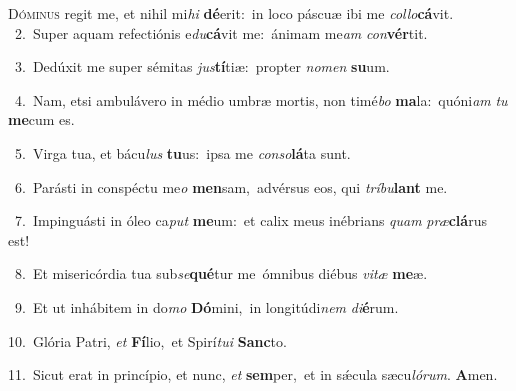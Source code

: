 \lettrine{\initial\textcolor{\initialcolor}{D}}{óminus} regit me, et nihil mi\textit{hi} \textbf{dé}\-erit:~\star in loco páscuæ ibi me \textit{col}\-\textit{lo}\textbf{cá}vit.\\
{\numbfont\textcolor{\numbcolor}{~2.}}~Super aquam refectiónis e\-\textit{du}\-\textbf{cá}vit me:~\star ánimam me\textit{am} \textit{con}\-\textbf{vér}tit.\par
{\numbfont\textcolor{\numbcolor}{~3.}}~Dedúxit me super sémitas \textit{jus}\-\textbf{tí}tiæ:~\star propter \textit{no}\-\textit{men} \textbf{su}\-um.\par
{\numbfont\textcolor{\numbcolor}{~4.}}~Nam, etsi ambulávero in médio umbræ mortis, non timé\textit{bo} \textbf{ma}\-la:~\star quóni\textit{am} \textit{tu} \textbf{me}\-cum es.\par
{\numbfont\textcolor{\numbcolor}{~5.}}~Virga tua, et bácu\textit{lus} \textbf{tu}\-us:~\star ipsa me \textit{con}\-\textit{so}\textbf{lá}ta sunt.\par
{\numbfont\textcolor{\numbcolor}{~6.}}~Parásti in conspéctu me\textit{o} \textbf{men}\-sam,~\star advérsus eos, qui \textit{trí}\-\textit{bu}\textbf{lant} me.\par
{\numbfont\textcolor{\numbcolor}{~7.}}~Impinguásti in óleo ca\textit{put} \textbf{me}\-um:~\star et calix meus inébrians \textit{quam} \textit{præ}\-\textbf{clá}rus est!\par
{\numbfont\textcolor{\numbcolor}{~8.}}~Et misericórdia tua sub\-\textit{se}\-\textbf{qué}tur me~\star ómnibus diébus \textit{vi}\-\textit{tæ} \textbf{me}\-æ.\par
{\numbfont\textcolor{\numbcolor}{~9.}}~Et ut inhábitem in do\textit{mo} \textbf{Dó}\-mini,~\star in longitúdi\textit{nem} \textit{di}\-\textbf{é}rum.\par
{\numbfont\textcolor{\numbcolor}{10.}}~Glória Patri, \textit{et} \textbf{Fí}\-lio,~\star et Spirí\-\textit{tu}\-\textit{i} \textbf{Sanc}\-to.\par
{\numbfont\textcolor{\numbcolor}{11.}}~Sicut erat in princípio, et nunc, \textit{et} \textbf{sem}\-per,~\star et in sǽcula sæcu\-\textit{ló}\-\textit{rum}. \textbf{A}\-men.\par
